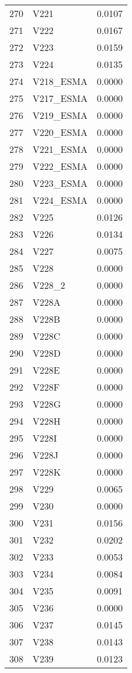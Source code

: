 \documentclass{amsart}
\begin{document}
\begin{longtable}{rlr}
  270 & V221 & 0.0107 \\ 
  271 & V222 & 0.0167 \\ 
  272 & V223 & 0.0159 \\ 
  273 & V224 & 0.0135 \\ 
  274 & V218\_ESMA & 0.0000 \\ 
  275 & V217\_ESMA & 0.0000 \\ 
  276 & V219\_ESMA & 0.0000 \\ 
  277 & V220\_ESMA & 0.0000 \\ 
  278 & V221\_ESMA & 0.0000 \\ 
  279 & V222\_ESMA & 0.0000 \\ 
  280 & V223\_ESMA & 0.0000 \\ 
  281 & V224\_ESMA & 0.0000 \\ 
  282 & V225 & 0.0126 \\ 
  283 & V226 & 0.0134 \\ 
  284 & V227 & 0.0075 \\ 
  285 & V228 & 0.0000 \\ 
  286 & V228\_2 & 0.0000 \\ 
  287 & V228A & 0.0000 \\ 
  288 & V228B & 0.0000 \\ 
  289 & V228C & 0.0000 \\ 
  290 & V228D & 0.0000 \\ 
  291 & V228E & 0.0000 \\ 
  292 & V228F & 0.0000 \\ 
  293 & V228G & 0.0000 \\ 
  294 & V228H & 0.0000 \\ 
  295 & V228I & 0.0000 \\ 
  296 & V228J & 0.0000 \\ 
  297 & V228K & 0.0000 \\ 
  298 & V229 & 0.0065 \\ 
  299 & V230 & 0.0000 \\ 
  300 & V231 & 0.0156 \\ 
  301 & V232 & 0.0202 \\ 
  302 & V233 & 0.0053 \\ 
  303 & V234 & 0.0084 \\ 
  304 & V235 & 0.0091 \\ 
  305 & V236 & 0.0000 \\ 
  306 & V237 & 0.0145 \\ 
  307 & V238 & 0.0143 \\ 
  308 & V239 & 0.0123 \\ 

\end{longtable}
\end{document}
